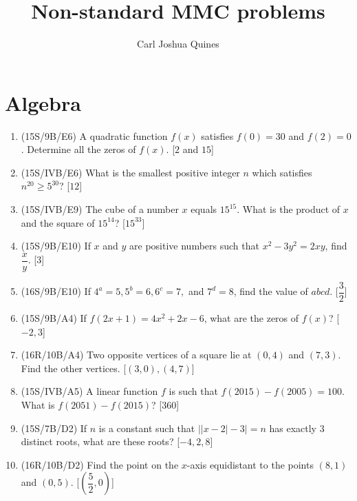 \documentclass[11pt,paper=letter]{scrartcl}
\begin{document}
\title{Non-standard MMC problems}
\author{Carl Joshua Quines}
\date{}
\maketitle

\section{Algebra}

\begin{enumerate}

\item (15S/9B/E6) A quadratic function $f(x)$ satisfies $f(0) = 30$ and $f(2) = 0$. Determine all the zeros of $f(x)$. \hfill [$2$ and $15$]

\item (15S/IVB/E6) What is the smallest positive integer $n$ which satisfies $n^{20} \geq 5^{30}$? \hfill [$12$]

\item (15S/IVB/E9) The cube of a number $x$ equals $15^{15}$. What is the product of $x$ and the square of $15^{14}$? \hfill [$15^{33}$]

\item (15S/9B/E10) If $x$ and $y$ are positive numbers such that $x^2 - 3y^2 = 2xy$, find $\dfrac{x}{y}$. \hfill [$3$]

\item (16S/9B/E10) If $4^a = 5, 5^b = 6, 6^c = 7,$ and $7^d = 8$, find the value of $abcd$. \hfill [$\dfrac{3}{2}$]

\item (15S/9B/A4) If $f(2x + 1) = 4x^2 + 2x - 6$, what are the zeros of $f(x)$? \hfill [$-2, 3$]

\item (16R/10B/A4) Two opposite vertices of a square lie at $(0, 4)$ and $(7, 3)$. Find the other vertices. \phantom{.} \hfill [$(3, 0), (4, 7)$]

\item (15S/IVB/A5) A linear function $f$ is such that $f(2015) - f(2005) = 100$. What is $f(2051) - f(2015)$? \hfill [$360$]

\item (15S/7B/D2) If $n$ is a constant such that $\left| |x - 2| - 3 \right| = n$ has exactly $3$ distinct roots, what are these roots? \hfill [$-4, 2, 8$]

\item (16R/10B/D2) Find the point on the $x$-axis equidistant to the points $(8, 1)$ and $(0, 5)$. \hfill [$(\dfrac{5}{2} ,0)$]


\end{enumerate}
\end{document}
